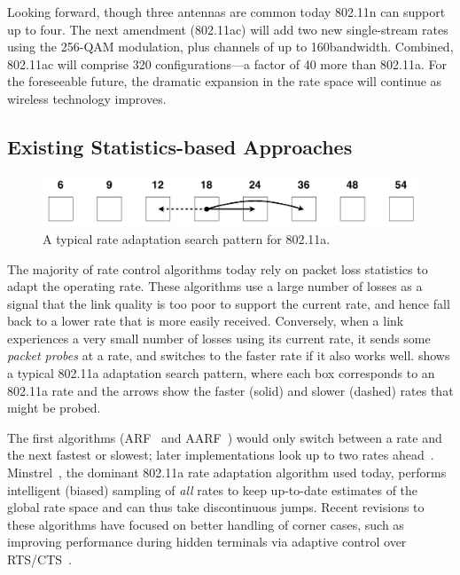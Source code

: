 Looking forward, though three antennas are common today 802.11n can support up to four. The next amendment (802.11ac) will add two new single-stream rates using the 256-QAM modulation, plus channels of up to 160\MHz bandwidth. Combined, 802.11ac will comprise 320 configurations---a factor of 40 more than 802.11a. For the foreseeable future, the dramatic expansion in the rate space will continue as wireless technology improves.

\subsection{Existing Statistics-based Approaches}
\begin{figure}[t]
      \centering
      \includegraphics[scale=0.4]{figures/approach_figs/search_11a.pdf}
      \caption[Rate adaptation search pattern for 802.11a]{\label{fig:search_11a}A typical rate adaptation search pattern for 802.11a.}
\end{figure}
The majority of rate control algorithms today rely on packet loss statistics to adapt the operating rate. These algorithms use a large number of losses as a signal that the link quality is too poor to support the current rate, and hence fall back to a lower rate that is more easily received. Conversely, when a link experiences a very small number of losses using its current rate, it sends some \emph{packet probes} at a rate, and switches to the faster rate if it also works well.  shows a typical 802.11a adaptation search pattern, where each box corresponds to an 802.11a rate and the arrows show the faster (solid) and slower (dashed) rates that might be probed.

The first algorithms (ARF~\cite{Kamerman_ARF} and AARF~\cite{Lacage_AARF}) would only switch between a rate and the next fastest or slowest; later implementations look up to two rates ahead~\cite{Bicket_SampleRate}. Minstrel~\cite{Minstrel}, the dominant 802.11a rate adaptation algorithm used today, performs intelligent (biased) sampling of \emph{all} rates to keep up-to-date estimates of the global rate space and can thus take discontinuous jumps. Recent revisions to these algorithms have focused on better handling of corner cases, such as improving performance during hidden terminals via adaptive control over RTS/CTS~\cite{Minstrel,Wong_RRAA}.

